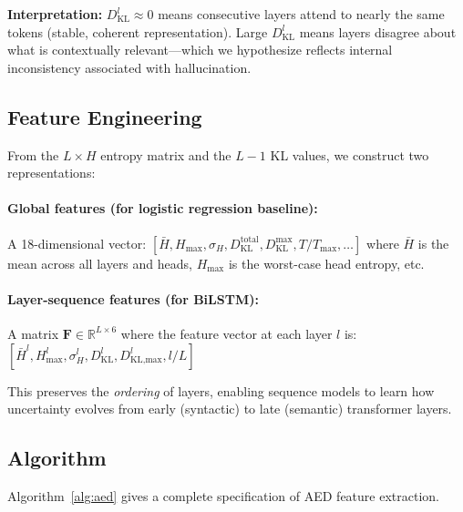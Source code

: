 \documentclass[11pt]{article}
\begin{document}
\textbf{Interpretation:}
$D_{\text{KL}}^l \approx 0$ means consecutive layers attend to nearly the 
same tokens (stable, coherent representation). 
Large $D_{\text{KL}}^l$ means layers disagree about what is contextually 
relevant—which we hypothesize reflects internal inconsistency associated 
with hallucination.

\subsection{Feature Engineering}

From the $L \times H$ entropy matrix and the $L-1$ KL values, we construct 
two representations:

\paragraph{Global features (for logistic regression baseline):}
A 18-dimensional vector:
$[\bar{H}, H_{\max}, \sigma_H, D_{\text{KL}}^{\text{total}}, D_{\text{KL}}^{\max}, T/T_{\max}, \ldots]$
where $\bar{H}$ is the mean across all layers and heads, $H_{\max}$ is the worst-case head entropy, etc.

\paragraph{Layer-sequence features (for BiLSTM):}
A matrix $\mathbf{F} \in \mathbb{R}^{L \times 6}$ where the feature vector 
at each layer $l$ is:
$[\bar{H}^l, H_{\max}^l, \sigma^l_H, D_{\text{KL}}^l, D_{\text{KL,max}}^l, l/L]$

This preserves the \emph{ordering} of layers, enabling sequence models 
to learn how uncertainty evolves from early (syntactic) to late (semantic) 
transformer layers.

\subsection{Algorithm}

Algorithm~\ref{alg:aed} gives a complete specification of AED feature extraction.
\end{document}
